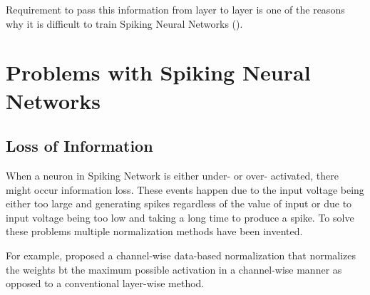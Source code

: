 
Requirement to pass this information from layer to layer is one of the reasons why it is difficult to train Spiking Neural Networks (). 

\section{Problems with Spiking Neural Networks}

\subsection{Loss of Information}

When a neuron in Spiking Network is either under- or over- activated, there might occur information loss. These events happen due to the input voltage being either too large and generating spikes regardless of the value of input or due to input voltage being too low and taking a long time to produce a spike. To solve these problems multiple normalization methods have been invented.

For example,  proposed a channel-wise data-based normalization that normalizes the weights bt the maximum possible activation in a channel-wise manner as opposed to a conventional layer-wise method. 

